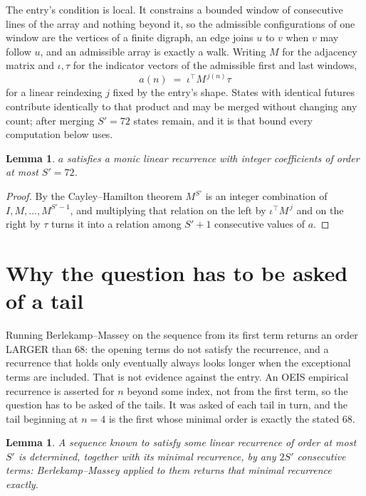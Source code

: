 \documentclass[11pt,a4paper]{article}
\theoremstyle{plain}
\newtheorem{lemma}[theorem]{Lemma}
\theoremstyle{definition}
\begin{document}
The entry's condition is local. It constrains a bounded window of consecutive lines of the
array and nothing beyond it, so the admissible configurations of one window are the vertices of
a finite digraph, an edge joins $u$ to $v$ when $v$ may follow $u$, and an admissible array is
exactly a walk. Writing $M$ for the adjacency matrix and $\iota,\tau$ for the indicator vectors
of the admissible first and last windows,
\[
a(n)\;=\;\iota^{\!\top}M^{\,j(n)}\tau
\]
for a linear reindexing $j$ fixed by the entry's shape. States with identical futures
contribute identically to that product and may be merged without changing any count; after
merging $S'=72$ states remain, and it is that bound every computation below uses.

\begin{lemma}\label{lem:cf}
$a$ satisfies a monic linear recurrence with integer coefficients of order at most $S'=72$.
\end{lemma}

\begin{proof}
By the Cayley--Hamilton theorem $M^{S'}$ is an integer combination of $I,M,\dots,M^{S'-1}$,
and multiplying that relation on the left by $\iota^{\!\top}M^{\,j}$ and on the right by
$\tau$ turns it into a relation among $S'+1$ consecutive values of $a$.
\end{proof}

\section{Why the question has to be asked of a tail}

Running Berlekamp--Massey on the sequence from its first term returns an order LARGER than $68$: the opening terms do not satisfy the recurrence, and a recurrence that holds only eventually always looks longer when the exceptional terms are included. That is not evidence against the entry. An OEIS empirical recurrence is asserted for $n$ beyond some index, not from the first term, so the question has to be asked of the tails. It was asked of each tail in turn, and the tail beginning at $n=4$ is the first whose minimal order is exactly the stated $68$.

\begin{lemma}\label{lem:bm}
A sequence known to satisfy some linear recurrence of order at most $S'$ is determined,
together with its minimal recurrence, by any $2S'$ consecutive terms: Berlekamp--Massey applied
to them returns that minimal recurrence exactly.
\end{lemma}
\end{document}
